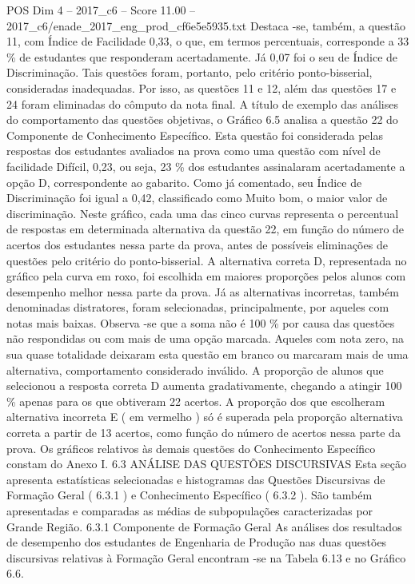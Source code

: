 \begin{textsample}{POS Dim 4 – 2017\_c6 – Score 11.00 – 2017\_c6/enade\_2017\_eng\_prod\_cf6e5e5935.txt}
Destaca -se, também, a questão 11, com Índice de Facilidade 0,33, o que, em termos percentuais, corresponde a 33 \% de estudantes que responderam acertadamente.
Já 0,07 foi o seu de Índice de Discriminação.
Tais questões foram, portanto, pelo critério ponto-bisserial, consideradas inadequadas.
Por isso, as questões 11 e 12, além das questões 17 e 24 foram eliminadas do cômputo da nota final.
A título de exemplo das análises do comportamento das questões objetivas, o Gráfico 6.5 analisa a questão 22 do Componente de Conhecimento Específico.
Esta questão foi considerada pelas respostas dos estudantes avaliados na prova como uma questão com nível de facilidade Difícil, 0,23, ou seja, 23 \% dos estudantes assinalaram acertadamente a opção D, correspondente ao gabarito.
Como já comentado, seu Índice de Discriminação foi igual a 0,42, classificado como Muito bom, o maior valor de discriminação.
Neste gráfico, cada uma das cinco curvas representa o percentual de respostas em determinada alternativa da questão 22, em função do número de acertos dos estudantes nessa parte da prova, antes de possíveis eliminações de questões pelo critério do ponto-bisserial.
A alternativa correta D, representada no gráfico pela curva em roxo, foi escolhida em maiores proporções pelos alunos com desempenho melhor nessa parte da prova.
Já as alternativas incorretas, também denominadas distratores, foram selecionadas, principalmente, por aqueles com notas mais baixas.
Observa -se que a soma não é 100 \% por causa das questões não respondidas ou com mais de uma opção marcada.
Aqueles com nota zero, na sua quase totalidade deixaram esta questão em branco ou marcaram mais de uma alternativa, comportamento considerado inválido.
A proporção de alunos que selecionou a resposta correta D aumenta gradativamente, chegando a atingir 100 \% apenas para os que obtiveram 22 acertos.
A proporção dos que escolheram alternativa incorreta E ( em vermelho ) só é superada pela proporção alternativa correta a partir de 13 acertos, como função do número de acertos nessa parte da prova.
Os gráficos relativos às demais questões do Conhecimento Específico constam do Anexo I. 6.3 ANÁLISE DAS QUESTÕES DISCURSIVAS Esta seção apresenta estatísticas selecionadas e histogramas das Questões Discursivas de Formação Geral ( 6.3.1 ) e Conhecimento Específico ( 6.3.2 ).
São também apresentadas e comparadas as médias de subpopulações caracterizadas por Grande Região. 6.3.1 Componente de Formação Geral As análises dos resultados de desempenho dos estudantes de Engenharia de Produção nas duas questões discursivas relativas à Formação Geral encontram -se na Tabela 6.13 e no Gráfico 6.6.

\end{textsample}
